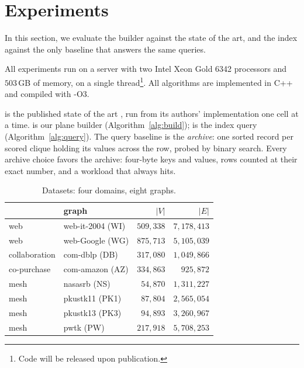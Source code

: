 \section{Experiments}\label{sec:experiments}
In this section, we evaluate the builder against the state of the art, and the index against the only baseline that answers the same queries.

All experiments run on a server with two Intel Xeon Gold 6342 processors and $503$\,GB of memory, on a single thread\footnote{Code will be released upon publication.}.
%
All algorithms are implemented in C++ and compiled with \textsf{-O3}.

\cnd{} is the published state of the art \cite{NuclearCD}, run from its authors' implementation one cell at a time.
%
\buildalg{} is our plane builder (Algorithm~\ref{alg:build}); \queryalg{} is the index query (Algorithm~\ref{alg:query}).
%
The query baseline is the \emph{archive}: one sorted record per scored clique holding its values across the row, probed by binary search.
%
Every archive choice favors the archive: four-byte keys and values, rows counted at their exact number, and a workload that always hits.

\begin{table}[t]
\centering
\caption{Datasets: four domains, eight graphs.}\label{tab:datasets}
\small
\begin{tabular}{@{}llrr@{}}
\toprule
 & graph & $|V|$ & $|E|$\\
\midrule
web & \textsf{web-it-2004} (WI) & $509{,}338$ & $7{,}178{,}413$\\
web & \textsf{web-Google} (WG) & $875{,}713$ & $5{,}105{,}039$\\
collaboration & \textsf{com-dblp} (DB) & $317{,}080$ & $1{,}049{,}866$\\
co-purchase & \textsf{com-amazon} (AZ) & $334{,}863$ & $925{,}872$\\
mesh & \textsf{nasasrb} (NS) & $54{,}870$ & $1{,}311{,}227$\\
mesh & \textsf{pkustk11} (PK1) & $87{,}804$ & $2{,}565{,}054$\\
mesh & \textsf{pkustk13} (PK3) & $94{,}893$ & $3{,}260{,}967$\\
mesh & \textsf{pwtk} (PW) & $217{,}918$ & $5{,}708{,}253$\\
\bottomrule
\end{tabular}
\end{table}

